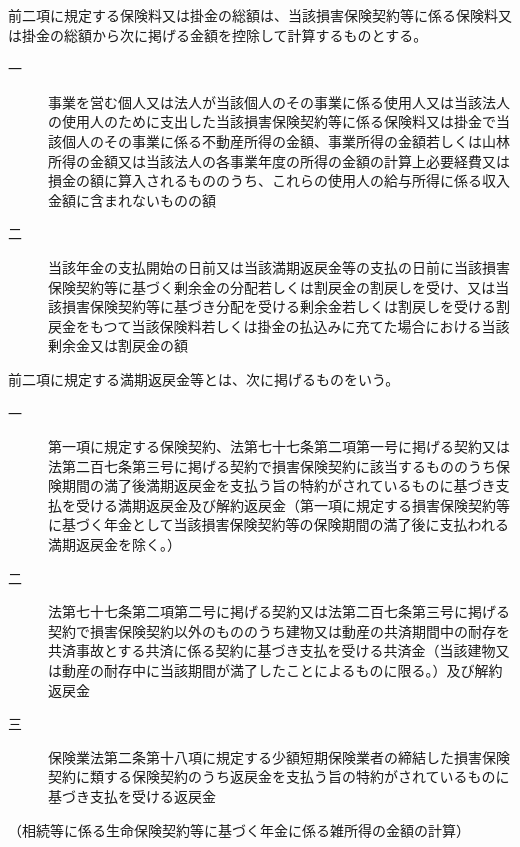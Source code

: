\documentclass[twocolumn,a4j,10pt]{ltjtarticle}
\begin{document}
\begin{description}
\begin{description}
\end{description}
\item[\rensuji{3}]前二項に規定する保険料又は掛金の総額は、当該損害保険契約等に係る保険料又は掛金の総額から次に掲げる金額を控除して計算するものとする。
\begin{description}
\item[一]事業を営む個人又は法人が当該個人のその事業に係る使用人又は当該法人の使用人のために支出した当該損害保険契約等に係る保険料又は掛金で当該個人のその事業に係る不動産所得の金額、事業所得の金額若しくは山林所得の金額又は当該法人の各事業年度の所得の金額の計算上必要経費又は損金の額に算入されるもののうち、これらの使用人の給与所得に係る収入金額に含まれないものの額
\item[二]当該年金の支払開始の日前又は当該満期返戻金等の支払の日前に当該損害保険契約等に基づく剰余金の分配若しくは割戻金の割戻しを受け、又は当該損害保険契約等に基づき分配を受ける剰余金若しくは割戻しを受ける割戻金をもつて当該保険料若しくは掛金の払込みに充てた場合における当該剰余金又は割戻金の額
\end{description}
\item[\rensuji{4}]前二項に規定する満期返戻金等とは、次に掲げるものをいう。
\begin{description}
\item[一]第一項に規定する保険契約、法第七十七条第二項第一号に掲げる契約又は法第二百七条第三号に掲げる契約で損害保険契約に該当するもののうち保険期間の満了後満期返戻金を支払う旨の特約がされているものに基づき支払を受ける満期返戻金及び解約返戻金（第一項に規定する損害保険契約等に基づく年金として当該損害保険契約等の保険期間の満了後に支払われる満期返戻金を除く。）
\item[二]法第七十七条第二項第二号に掲げる契約又は法第二百七条第三号に掲げる契約で損害保険契約以外のもののうち建物又は動産の共済期間中の耐存を共済事故とする共済に係る契約に基づき支払を受ける共済金（当該建物又は動産の耐存中に当該期間が満了したことによるものに限る。）及び解約返戻金
\item[三]保険業法第二条第十八項に規定する少額短期保険業者の締結した損害保険契約に類する保険契約のうち返戻金を支払う旨の特約がされているものに基づき支払を受ける返戻金
\end{description}
\end{description}
\noindent\hspace{10pt}（相続等に係る生命保険契約等に基づく年金に係る雑所得の金額の計算）
\end{document}
